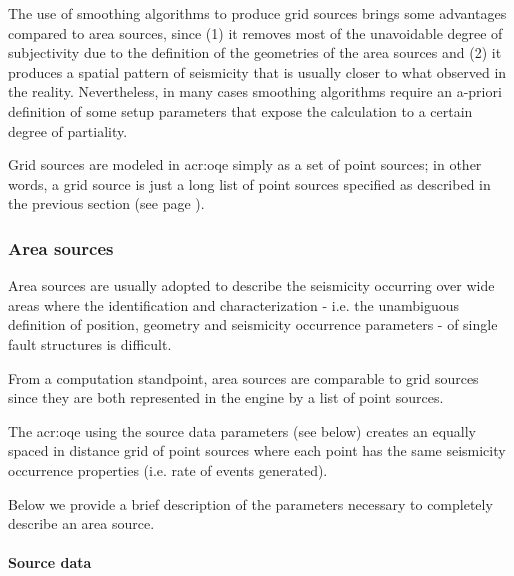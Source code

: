 The use of smoothing algorithms to produce grid sources brings some
advantages compared to area sources, since (1) it removes most of the
unavoidable degree of subjectivity due to the definition of the geometries of the area sources and (2) it produces a spatial pattern of seismicity that is usually closer to what observed in the reality. Nevertheless, in many cases smoothing algorithms require an a-priori definition of some setup parameters that expose the calculation to a certain degree of partiality.

Grid sources are modeled in \gls{acr:oqe} simply as a set of point sources; in other words, a grid source is just a long list of point sources specified as described in the previous section (see page
\pageref{subsubsec:point_sources}).

\subsubsection{Area sources}
\label{subsubsec:area_sources}

Area sources are usually adopted to describe the seismicity occurring over wide areas where the identification and characterization - i.e. the
unambiguous definition of position, geometry and seismicity occurrence
parameters - of single fault structures is difficult.

From a computation standpoint, area sources are comparable to grid sources since they are both represented in the engine by a list of point sources.

The \gls{acr:oqe} using the source data parameters (see below) creates an
equally spaced in distance grid of point sources where each point has the same seismicity occurrence properties (i.e. rate of events generated).

Below we provide a brief description of the parameters necessary to completely describe an area source.

\paragraph{Source data}

